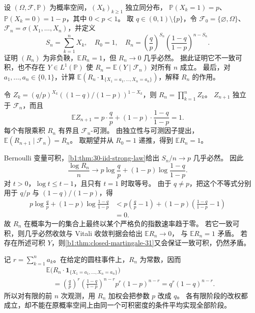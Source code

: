 \begin{exercise}\label{b1:ex:31-bernoulli-density-martingale}
设 \((\Omega,\mathcal F,\mathbb P)\) 为概率空间，\((X_k)_{k\geq1}\) 独立同分布，
\(\mathbb P(X_k=1)=p\)、\(\mathbb P(X_k=0)=1-p\)，其中 \(0<p<1\)。
取 \(q\in(0,1)\setminus\{p\}\)，令 \(\mathcal F_0=\{\varnothing,\Omega\}\)、
\(\mathcal F_n=\sigma(X_1,\ldots,X_n)\)，并定义
\[
 S_n=\sum_{k=1}^nX_k,\quad R_0=1,\quad
 R_n=\left(\frac qp\right)^{S_n}
       \left(\frac{1-q}{1-p}\right)^{n-S_n}.
\]
证明 \((R_n)\) 为非负鞅，\(\mathbb ER_n=1\)，但 \(R_n\to0\) 几乎必然。
据此证明它不一致可积，也不存在 \(Y\in L^1(\mathbb P)\) 使
\(R_n=\mathbb E(Y\mid\mathcal F_n)\) 对所有 \(n\) 成立。
最后，对 \(a_1,\ldots,a_n\in\{0,1\}\)，计算
\(\mathbb E(R_n\cdot\mathbf1_{\{X_1=a_1,\ldots,X_n=a_n\}})\)，解释 \(R_n\) 的作用。
\end{exercise}
\begin{solution}
令 \(Z_k=(q/p)^{X_k}((1-q)/(1-p))^{1-X_k}\)，则 \(R_n=\prod_{k=1}^nZ_k\)。
\(Z_{n+1}\) 独立于 \(\mathcal F_n\)，而且
\[
 \mathbb EZ_{n+1}=p\cdot\frac qp+(1-p)\cdot\frac{1-q}{1-p}=1.
\]
每个有限乘积 \(R_n\) 有界且 \(\mathcal F_n\)-可测。
由独立性与可测因子提出，\(\mathbb E(R_{n+1}\mid\mathcal F_n)=R_n\)。
取期望并从 \(R_0=1\) 递推，得到 \(\mathbb ER_n=1\)。

Bernoulli 变量可积，\cref{b1:thm:30-iid-strong-law}给出 \(S_n/n\to p\) 几乎必然。
因此
\[
 \frac{\log R_n}{n}
 \longrightarrow
 p\log\frac qp+(1-p)\log\frac{1-q}{1-p}.
\]
对 \(t>0\)，\(\log t\leq t-1\)，且只有 \(t=1\) 时取等号。
由于 \(q\ne p\)，把这个不等式分别用于 \(q/p\) 与 \((1-q)/(1-p)\)，得
\[
 \begin{aligned}
 p\log\frac qp+(1-p)\log\frac{1-q}{1-p}
 &<p\left(\frac qp-1\right)
 +(1-p)\left(\frac{1-q}{1-p}-1\right)\\
 &=0.
 \end{aligned}
\]
故 \(R_n\) 在概率为一的集合上最终以某个严格负的指数速率趋于零。
若它一致可积，则几乎必然收敛与 Vitali 收敛判据会给出 \(\mathbb ER_n\to0\)，
与 \(\mathbb ER_n=1\) 矛盾。
若存在所述可积 \(Y\)，则\cref{b1:thm:closed-martingale-31}又会保证一致可积，仍然矛盾。

记 \(r=\sum_{k=1}^na_k\)。在给定的圆柱事件上，\(R_n\) 为常数，因而
\[
 \begin{aligned}
 &\mathbb E\bigl(R_n\cdot\mathbf1_{\{X_1=a_1,\ldots,X_n=a_n\}}\bigr)\\
 &\quad=\left(\frac qp\right)^r\left(\frac{1-q}{1-p}\right)^{n-r}
      p^r(1-p)^{n-r}
 =q^r(1-q)^{n-r}.
 \end{aligned}
\]
所以对有限的前 \(n\) 次观测，用 \(R_n\) 加权会把参数 \(p\) 改成 \(q\)。
各有限阶段的改权都成立，却不能在原概率空间上由同一个可积密度的条件平均实现全部阶段。
\end{solution}

